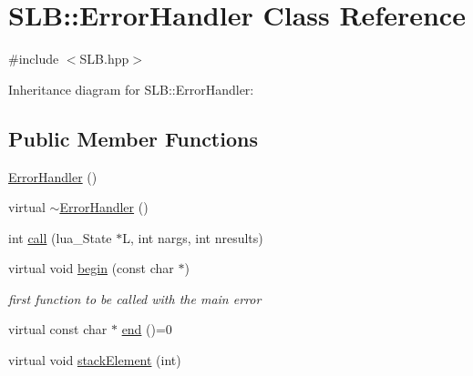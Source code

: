 \hypertarget{classSLB_1_1ErrorHandler}{}\section{S\+LB\+:\+:Error\+Handler Class Reference}
\label{classSLB_1_1ErrorHandler}


{\ttfamily \#include $<$S\+L\+B.\+hpp$>$}



Inheritance diagram for S\+LB\+:\+:Error\+Handler\+:
\subsection*{Public Member Functions}
\begin{DoxyCompactItemize}
\item 
\hyperlink{classSLB_1_1ErrorHandler_a0ad571b23d26e47847b9445cef2a7783}{Error\+Handler} ()
\item 
virtual \hyperlink{classSLB_1_1ErrorHandler_a9b4650d3414c4bb52b005e0159515f2e}{$\sim$\+Error\+Handler} ()
\item 
int \hyperlink{classSLB_1_1ErrorHandler_ad2aa3aa61e67d5789bbe5da4fa0cc39d}{call} (lua\+\_\+\+State $\ast$L, int nargs, int nresults)
\item 
virtual void \hyperlink{classSLB_1_1ErrorHandler_a3bb48f944dd1f37b4f8308f8dd2db3b8}{begin} (const char $\ast$)
\begin{DoxyCompactList}\small\item\em first function to be called with the main error \end{DoxyCompactList}\item 
virtual const char $\ast$ \hyperlink{classSLB_1_1ErrorHandler_a039030d861249644ab496d0d23e66bce}{end} ()=0
\item 
virtual void \hyperlink{classSLB_1_1ErrorHandler_a81782d504556ac90780ac40d89cbad9a}{stack\+Element} (int)
\end{DoxyCompactItemize}
